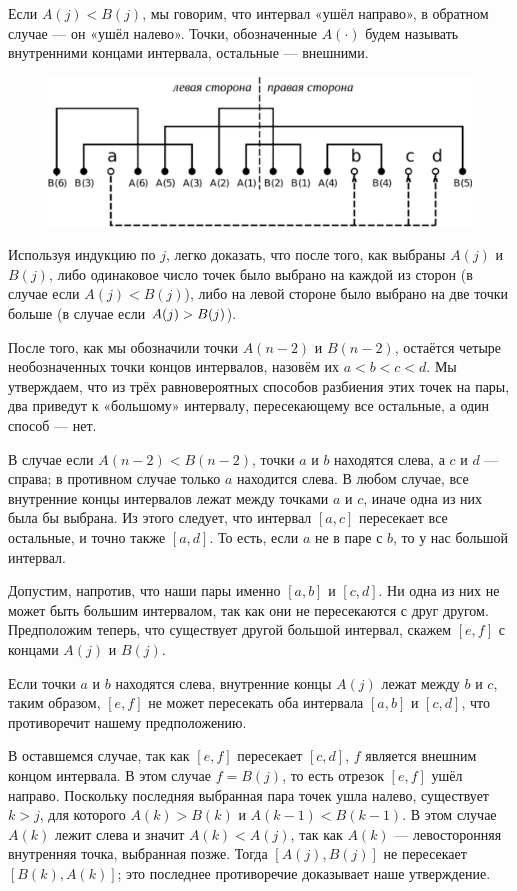 Если $A(j) < B(j)$, мы говорим, что интервал «ушёл направо», в обратном случае --- он «ушёл налево».
Точки, обозначенные $A({\cdot})$ будем называть внутренними концами интервала, остальные --- внешними.

\begin{figure}[h!]
\centering
\includegraphics[scale=0.55]{Figs/Probability/labeling-ru}
\end{figure} 

Используя индукцию по $j$, легко доказать, что после того, как выбраны $A(j)$ и $B(j)$, либо одинаковое число точек было выбрано на каждой из сторон (в случае если $A(j) < B(j)$), либо на левой стороне было выбрано на две точки больше (в случае если $A(j) \z> B(j)$).

После того, как мы обозначили точки $A(n-2)$ и $B(n-2)$, остаётся четыре необозначенных точки концов интервалов, назовём их $a<b<c< d$.
Мы утверждаем, что из трёх равновероятных способов разбиения этих точек на пары, два приведут к «большому» интервалу, пересекающему все остальные, а один способ --- нет.

В случае если $A(n-2) < B(n-2)$, точки $a$ и $b$ находятся слева, а $c$ и $d$ --- справа;
в противном случае только $a$ находится слева.
В любом случае, все внутренние концы интервалов лежат между точками $a$ и $c$, иначе одна из них была бы выбрана.
Из этого следует, что интервал $[a,c]$ пересекает все остальные, и точно также $[a,d]$.
То есть, если $a$ не в паре с $b$, то у нас большой интервал.

Допустим, напротив, что наши пары именно $[a, b]$ и $[c, d]$.
Ни одна из них не может быть большим интервалом, так как они не пересекаются с друг другом.
Предположим теперь, что существует другой большой интервал, скажем $[e,f]$ с концами $A(j)$ и $B(j)$.

Если точки $a$ и $b$ находятся слева, внутренние концы $A(j)$ лежат между $b$ и $c$, таким образом, $[e, f]$ не может пересекать оба интервала $[a, b]$ и $[c, d]$, что противоречит нашему предположению.

В оставшемся случае, так как $[e, f]$ пересекает $[c, d]$, $f$ является внешним концом интервала. 
В этом случае $f=B(j)$, то есть отрезок $[e, f]$ ушёл направо.
Поскольку последняя выбранная пара точек ушла налево, существует $k>j$, для которого $A(k)>B(k)$ и $A(k-1)<B(k-1)$.
В этом случае $A(k)$ лежит слева и значит $A(k) < A(j)$, так как $A(k)$ --- левосторонняя внутренняя точка, выбранная позже.
Тогда $[A(j), B(j)]$ не пересекает $[B(k), A(k)]$; это последнее противоречие доказывает наше утверждение.
\heart


